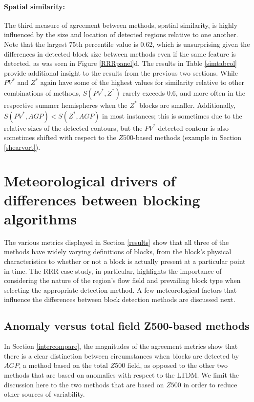 \documentclass[smallextended]{svjour3}       %
\numberwithin{equation}{section}
\begin{document}
\paragraph{Spatial similarity:} The third measure of agreement between methods, spatial similarity, is highly influenced by the size and location of detected regions relative to one another. Note that the largest 75th percentile value is 0.62, which is unsurprising given the differences in detected block size between methods even if the same feature is detected, as was seen in Figure \ref{RRRpanel}d.   The results in Table \ref{simtabcol} provide additional insight to the results from the previous two sections. While $PV^*$ and $Z^*$ again have some of the highest values for similarity relative to other combinations of methods, $S(PV^*,Z^*)$ rarely exceeds 0.6, and more often in the respective summer hemispheres when the $Z^*$ blocks are smaller. Additionally, $S(PV^*,AGP)<S(Z^*,AGP)$ in most instances; this is sometimes due to the relative sizes of the detected contours, but the $PV^*$-detected contour is also sometimes shifted with respect to the $Z500$-based methods (example in Section \ref{shearvort}).%




\section{Meteorological drivers of differences between blocking algorithms}\label{influences}

The various metrics displayed in Section \ref{results} show that all three of the methods have widely varying definitions of blocks, from the block's physical characteristics to whether or not a block is actually present at a particular point in time. The RRR case study, in particular, highlights the importance of considering the nature of the region's flow field and prevailing block type when selecting the appropriate detection method. A few meteorological factors that influence the differences between block detection methods are discussed next.


\subsection{Anomaly versus total field Z500-based methods}\label{anominst}

In Section \ref{intercompare}, the magnitudes of the agreement metrics show that there is a clear distinction between circumstances when blocks are detected by $AGP$, a method based on the total $Z500$ field, as opposed to the other two methods that are based on anomalies with respect to the LTDM. We limit the discussion here to the two methods that are based on $Z500$ in order to reduce other sources of variability.
\end{document}
